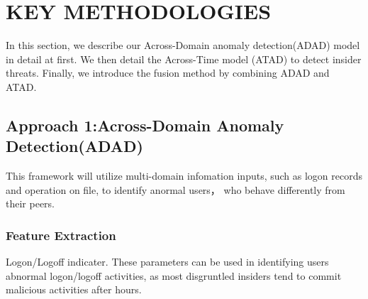 \documentclass[conference]{IEEEtran}
\begin{document}
\section{KEY METHODOLOGIES}
In this section, we describe our Across-Domain anomaly detection(ADAD) model in detail at first. We then detail the Across-Time model (ATAD) to detect insider threats. Finally, we introduce the fusion method by combining ADAD and ATAD.

\subsection{Approach 1:Across-Domain Anomaly Detection(ADAD)}\label{AA}
This framework will utilize multi-domain infomation inputs, such as logon records and operation on file, to identify anormal users， who behave differently from their peers.

\subsubsection{Feature Extraction}

Logon/Logoff indicater. These parameters can be used in identifying users abnormal logon/logoff activities, as most disgruntled insiders tend to commit malicious activities after hours.

\end{document}
